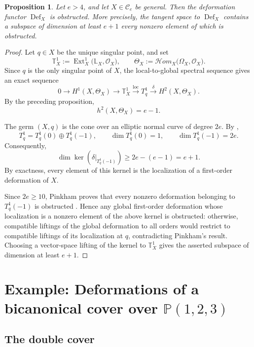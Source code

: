 \documentclass[11pt,twoside]{amsart}
\theoremstyle{plain}
\numberwithin{equation}{section}
\newtheorem{proposition}[theorem]{Proposition}
\theoremstyle{definition}
\begin{document}
\begin{proposition}\label{prop:obstructed-deformations}
Let $e>4$, and let $X\in\mathcal C_e$ be general. Then the deformation functor $\operatorname{Def}_X$ is obstructed. More precisely, the tangent space to $\operatorname{Def}_X$ contains a subspace of dimension at least $e+1$ every nonzero element of which is obstructed.
\end{proposition}

\begin{proof}
Let $q\in X$ be the unique singular point, and set
\[
\mathbb T_X^1
:=
\operatorname{Ext}_X^1
\bigl(\mathbb L_X,\mathcal O_X\bigr),
\qquad
\Theta_X
:=
\mathcal Hom_X
\bigl(\Omega_X,\mathcal O_X\bigr).
\]
Since $q$ is the only singular point of $X$, the local-to-global spectral sequence gives an exact sequence
\[
0
\longrightarrow
H^1(X,\Theta_X)
\longrightarrow
\mathbb T_X^1
\xrightarrow{\operatorname{loc}}
T_q^1
\xrightarrow{\delta}
H^2(X,\Theta_X).
\]
By the preceding proposition,
\[
h^2(X,\Theta_X)=e-1.
\]

The germ $(X,q)$ is the cone over an elliptic normal curve of degree $2e$. By \cite[Example~6.10]{Pinkham},
\[
T_q^1
=
T_q^1(0)\oplus T_q^1(-1),
\qquad
\dim T_q^1(0)=1,
\qquad
\dim T_q^1(-1)=2e.
\]
Consequently,
\[
\dim
\ker\!\left(
\delta|_{T_q^1(-1)}
\right)
\geq
2e-(e-1)
=
e+1.
\]
By exactness, every element of this kernel is the localization of a first-order deformation of $X$.

Since $2e\geq10$, Pinkham proves that every nonzero deformation belonging to $T_q^1(-1)$ is obstructed \cite[(9.2)(a)]{Pinkham}. Hence any global first-order deformation whose localization is a nonzero element of the above kernel is obstructed: otherwise, compatible liftings of the global deformation to all orders would restrict to compatible liftings of its localization at $q$, contradicting Pinkham's result. Choosing a vector-space lifting of the kernel to $\mathbb T_X^1$ gives the asserted subspace of dimension at least $e+1$.
\end{proof}

\section{Example: Deformations of a bicanonical cover over $\mathbb{P}(1,2,3)$}


\subsection{The double cover}
\end{document}
